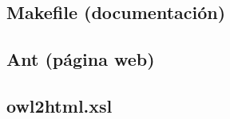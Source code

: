

\subsection*{Makefile (documentación)}



\subsection*{Ant (página web)}



\subsection*{owl2html.xsl}


